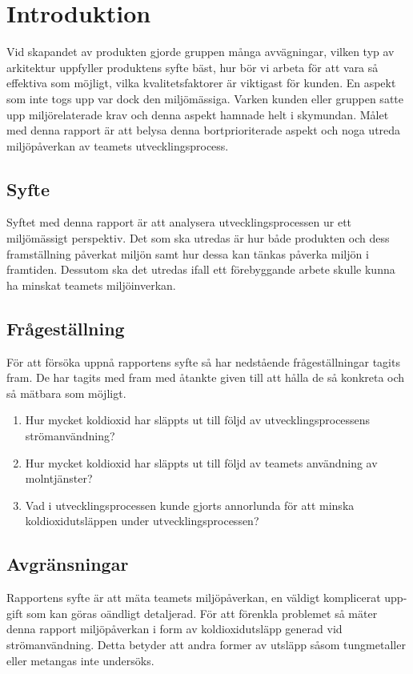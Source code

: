 \section{Introduktion}
\label{sec:joel_a-introduction}
Vid skapandet av produkten gjorde gruppen många avvägningar, vilken typ av arkitektur uppfyller produktens syfte bäst, hur bör vi arbeta för att vara så effektiva som möjligt, vilka kvalitetsfaktorer är viktigast för kunden. En aspekt som inte togs upp var dock den miljömässiga. Varken kunden eller gruppen satte upp miljörelaterade krav och denna aspekt hamnade helt i skymundan. Målet med denna rapport är att belysa denna bortprioriterade aspekt och noga utreda miljöpåverkan av teamets utvecklingsprocess.

\subsection{Syfte}
Syftet med denna rapport är att analysera utvecklingsprocessen ur ett miljömässigt perspektiv. Det som ska utredas är hur både produkten och dess framställning påverkat miljön samt hur dessa kan tänkas påverka miljön i framtiden. Dessutom ska det utredas ifall ett förebyggande arbete skulle kunna ha minskat teamets miljöinverkan.

\subsection{Frågeställning}
\label{subsec:joel_a-research-questions}
För att försöka uppnå rapportens syfte så har nedstående frågeställningar tagits fram. De har tagits med fram med åtankte given till att hålla de så konkreta och så mätbara som möjligt.

\begin{enumerate}
\item Hur mycket koldioxid har släppts ut till följd av utvecklingsprocessens strömanvändning?

\item Hur mycket koldioxid har släppts ut till följd av teamets användning av molntjänster?

\item Vad i utvecklingsprocessen kunde gjorts annorlunda för att minska koldioxidutsläppen under utvecklingsprocessen?

\end{enumerate}

\subsection{Avgränsningar}
\label{subsec:joel_a-delimitations}
Rapportens syfte är att mäta teamets miljöpåverkan, en väldigt komplicerat upp-
gift som kan göras oändligt detaljerad. För att förenkla problemet så mäter denna rapport
miljöpåverkan i form av koldioxidutsläpp generad vid strömanvändning. Detta betyder att andra former av utsläpp såsom tungmetaller eller metangas inte undersöks.